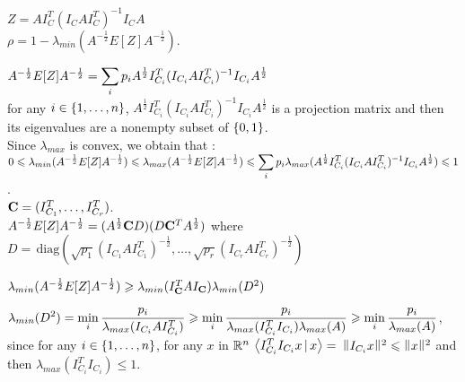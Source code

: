  
 
$Z = A I_{C}^{T} (I_{C} A I_{C}^{T})^{-1} I_{C} A$\\

$\rho = 1 - \lambda_{min}(A^{-\frac12}E[Z]A^{-\frac12}  )$.

$A^{-\frac12}E[Z]A^{-\frac12} = \dsp\sum\limits_{i} p_{i} A^{\frac 12} I_{C_{i}}^{T} (I_{C_{i}}  A  I_{C_{i}}^{T})^{-1} I_{C_{i}} A^{\frac 12}$ \\

for any $i \in \acco{1,\dots,n}$, $A^{\frac 12} I_{C_{i}}^{T} (I_{C_{i}}  A  I_{C_{i}}^{T})^{-1} I_{C_{i}} A^{\frac 12}$ is a projection matrix and then its eigenvalues are a nonempty subset of $\acco{0,1}$.\\

Since $\lambda_{max}$ is convex, we obtain that :\\

$0 \leq \lambda_{min}(A^{-\frac12}E[Z]A^{-\frac12}) \leq  \lambda_{max}(A^{-\frac12}E[Z]A^{-\frac12}) \leq \dsp\sum\limits_{i} p_{i} \lambda_{max}(A^{\frac 12} I_{C_{i}}^{T} (I_{C_{i}}  A  I_{C_{i}}^{T})^{-1} I_{C_{i}} A^{\frac 12}) \leq 1$.\\

$\bold{C} = (I_{C_{1}}^{T},\dots,I_{C_{r}}^{T})$.\\

$A^{-\frac12}E[Z]A^{-\frac12} = (A^{\frac 12} \bold{C} D)(D \bold{C}^{T} A^{\frac 12})$ where $D =  \,\text{diag}(\sqrt{p_{1}} (I_{C_{1}}A I_{C_{1}}^{T})^{-\frac 12},\dots, \sqrt{p_{r}}(I_{C_{r}} A I_{C_{r}}^{T})^{-\frac 12})$
 
 
 

$\lambda_{min}(A^{-\frac12}E[Z]A^{-\frac12} ) \geq \lambda_{min}(I_{\bold{C}}^{T}A I_{\bold{C}} ) \lambda_{min}(D^{2})$

$\dsp \lambda_{min}(D^{2}) =  \min_{i}  \frac{p_{i}}{\lambda_{max}(I_{C_{i}} A I_{C_{i}}^{T} ) } \geq  \min_{i}\frac{p_{i} }{\lambda_{max}(I_{C_{i}}^{T} I_{C_{i}}) \lambda_{max}(A)}  \geq \min_{i}\frac{ p_{i} }{\lambda_{max}(A)} $, 
since for any $i\in \acco{1,\dots,n}$, for any $x$ in $\R^{n}$ 
$\scal{I_{C_{i}}^{T} I_{C_{i}} x }{x} =$
$ \norm{ I_{C_{i}}x }^{2} \leq \norm{x}^{2}$
 and then $\lambda_{max}( I_{C_{i}}^{T} I_{C_{i}}  ) \leq 1$.\\
 
